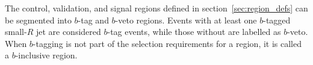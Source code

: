 The control, validation, and signal regions defined in section~\ref{sec:region_defs} can be segmented into $b$-tag and $b$-veto regions.
Events with at least one $b$-tagged small-$R$ jet are considered $b$-tag events, while those without are labelled as $b$-veto.
When $b$-tagging is not part of the selection requirements for a region, it is called a $b$-inclusive region.

